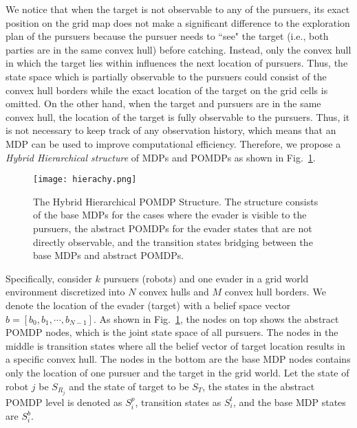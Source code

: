 \documentclass[../main.tex]{subfiles}
\begin{document}
We notice that when the target is not observable to any of the pursuers, its exact position on the grid map does not make a significant difference to the exploration plan of the pursuers because the pursuer needs to ``see" the target (i.e., both parties are in the same convex hull) before catching. Instead, only the convex hull in which the target lies within influences the next location of pursuers. 
Thus, the state space which is partially observable to the pursuers could consist of
the convex hull borders while the exact location of the target on the grid cells is omitted. 
On the other hand, when the target and pursuers are in the same convex hull, the location of the target is fully observable to the pursuers. Thus, it is not necessary to keep track of any observation history, which means that an MDP can be used to improve computational efficiency. Therefore, we propose a \textit{Hybrid Hierarchical structure} of MDPs and POMDPs as shown in Fig.~\ref{fig:pomdp_struct}.


\begin{figure}
    \centering
    \texttt{[image: hierachy.png]}
    \caption{The Hybrid Hierarchical POMDP Structure. The structure consists of the base MDPs for the cases where the evader is visible to the pursuers, the abstract POMDPs for the evader states that are not directly observable, and the transition states bridging between the base MDPs and abstract POMDPs.}
    \label{fig:pomdp_struct} 
\end{figure}

Specifically, consider $k$ pursuers (robots) and one evader in a grid world environment discretized into $N$ convex hulls and $M$ convex hull borders. We denote the location of the evader (target) with a belief space vector $b = [b_0, b_1, \cdots, b_{N-1}]$. As shown in Fig.~\ref{fig:pomdp_struct}, the nodes on top shows the abstract POMDP nodes, which is the joint state space of all pursuers. The nodes in the middle is transition states where all the belief vector of target location results in a specific convex hull. The nodes in the bottom are the base MDP nodes contains only the location of one pursuer and the target in the grid world. Let the state of robot $j$ be $S_{R_j}$ and the state of target to be $S_T$, the states in the abstract POMDP level is denoted as $S^p_i$, transition states as $S^t_i$, and the base MDP states are $S^b_i$. 
\end{document}
